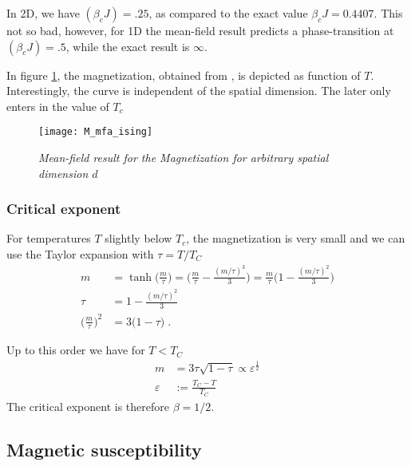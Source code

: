 In 2D, we have $(\beta_{c} J)=.25$, as compared to the exact value $\beta_{c}J=0.4407$.
This not so bad, however, for 1D the mean-field result predicts a phase-transition at $(\beta_{c} J)=.5$, while the exact result is $\infty$.

In figure \ref{fig:M:mfa:ising}, the magnetization, obtained from , is depicted as function of $T$. Interestingly, the curve is independent of the spatial dimension.
The later only enters in the value of $T_{c}$
\begin{figure}[t]
\begin{center}
\texttt{[image: M\_mfa\_ising]}
\caption{\it Mean-field result for the Magnetization for arbitrary spatial dimension $d$\label{fig:M:mfa:ising}}
\end{center}
\end{figure}

\subsubsection{Critical exponent}
For temperatures $T$ slightly below $T_{c}$, the magnetization is very small and we can use the Taylor expansion with $\tau = T/T_{C}$
\begin{align*}
m &= \tanh\big( \frac{m}{\tau} \big)= \bigg( \frac{m}{\tau} -\frac{(m/\tau)^{3}}{3} \bigg)
= \frac{m}{\tau}\bigg( 1- \frac{(m/\tau)^{2}}{3}\bigg)\\
\tau  &= 1 - \frac{(m/\tau)^{2}}{3}\\
\bigg(\frac{m}{\tau}\bigg)^{2} &= 3 \bigg( 1-\tau\bigg)\;.
\end{align*}

Up to this order we have for $T<T_{C}$
%
\begin{align}\label{eq:ising:mfa:m:Taylor}
m&= 3\tau \sqrt{1- \tau} \propto \varepsilon^{\frac{1}{2}}\\
\varepsilon &:= \frac{T_{C}-T}{T_{C}}
\end{align}
%
The  critical exponent is therefore $\beta=1/2$. 


\subsection{Magnetic susceptibility}

